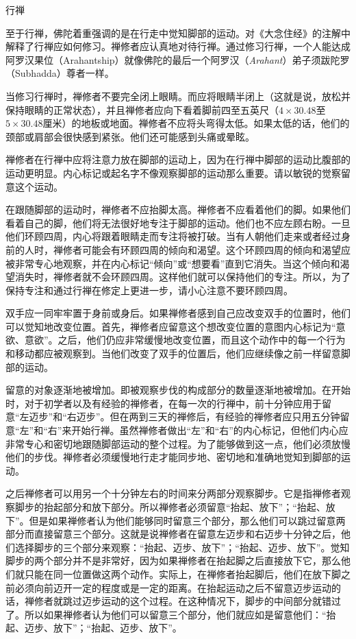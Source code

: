 \ssssubsectnonib 行禅

至于行禅，佛陀着重强调的是在行走中觉知脚部的运动。对《大念住经》的注解中解释了行禅应如何修习。禅修者应认真地对待行禅。通过修习行禅，一个人能达成阿罗汉果位（Arahantship）就像\1佛陀的最后一个阿罗汉（{\it Arahant}）弟子须跋陀罗（Subhadda）尊者一样。

当修习行禅时，禅修者不要完全闭上眼睛。而应将眼睛半闭上（这就是说，放松并保持眼睛的正常状态），并且禅修者应向下看着脚前四至五英尺（$4\times 30.48$至$5\times 30.48$厘米）的地板或地面。禅修者不应将头弯得太低。如果太低的话，他们的颈部或肩部会很快感到紧张。他们还可能感到头痛或晕眩。

禅修者在行禅中应将注意力放在脚部的运动上，因为在行禅中脚部的运动比腹部的运动更明显。内心标记或起名字不像观察脚部的运动那么重要。请以敏锐的觉察留意这个运动。

在跟随脚部的运动时，禅修者不应抬脚太高。禅修者不应看着他们的脚。如果他们看着自己的脚，他们将无法很好地专注于脚部的运动。他们也不应左顾右盼。一旦他们环顾四周，内心将跟着眼睛走而专注将被打破。当有人朝他们走来或者经过身前的人时，禅修者可能会有环顾四周的倾向和渴望。这个环顾四周的倾向和渴望应被非常专心地观察，并在内心标记“倾向”或“想要看”直到它消失。当这个倾向和渴望消失时，禅修者就不会环顾四周。这样他们就可以保持他们的专注。所以，为了保持专注和通过行禅在修定上更进一步，请小心注意不要环顾四周。

\1双手应一同牢牢置于身前或身后。如果禅修者感到自己应改变双手的位置时，他们可以觉知地改变位置。首先，禅修者应留意这个想改变位置的意图内心标记为“意欲、意欲”。之后，他们仍应非常缓慢地改变位置，而且这个动作中的每一个行为和移动都应被观察到。当他们改变了双手的位置后，他们应继续像之前一样留意脚部的运动。

留意的对象逐渐地被增加。即被观察步伐的构成部分的数量逐渐地被增加。在开始时，对于初学者以及有经验的禅修者，在每一次的行禅中，前十分钟应用于留意“左迈步”和“右迈步”。但在两到三天的禅修后，有经验的禅修者应只用五分钟留意“左”和“右”来开始行禅。虽然禅修者做出“左”和“右”的内心标记，但他们内心应非常专心和密切地跟随脚部运动的整个过程。为了能够做到这一点，他们必须放慢他们的步伐。禅修者必须缓慢地行走才能同步地、密切地和准确地觉知到脚部的运动。

之后禅修者可以用另一个十分钟左右的时间来分两部分观察脚步。它是指禅修者观察脚步的抬起部分和放下部分。所以禅修者必须留意“抬起、放下”；“抬起、放下”。但是如果禅修者认为他们能够同时留意三个部分，那么他们可以跳过留意两部分而直接留意三个部分。这就是说禅修者在留意左迈步和右迈步十分钟之后，他们选择\1脚步的三个部分来观察：“抬起、迈步、放下”；“抬起、迈步、放下”。觉知脚步的两个部分并不是非常好，因为如果禅修者在抬起脚之后直接放下它，那么他们就只能在同一位置做这两个动作。实际上，在禅修者抬起脚后，他们在放下脚之前必须向前迈开一定的程度或是一定的距离。在抬起运动之后不留意迈步运动的话，禅修者就跳过迈步运动的这个过程。在这种情况下，脚步的中间部分就错过了。所以如果禅修者认为他们可以留意三个部分，他们就应如是留意他们：“抬起、迈步、放下”；“抬起、迈步、放下”。

